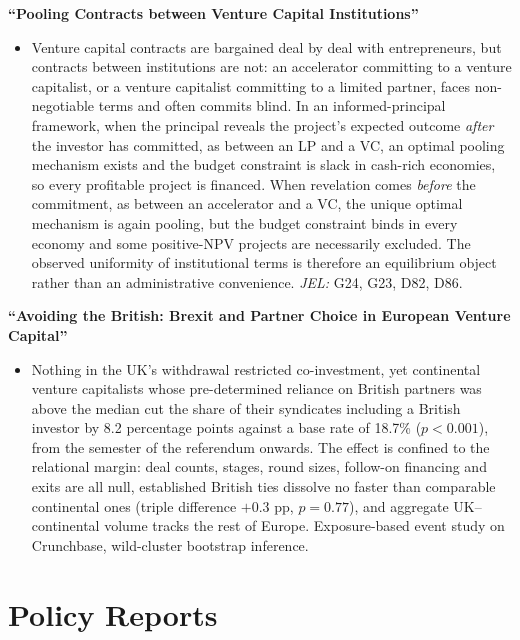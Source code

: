 \documentclass[11pt,a4paper]{article}
\begin{document}
\textbf{``Pooling Contracts between Venture Capital Institutions''}
\begin{itemize}[leftmargin=1.2em, itemsep=1pt, topsep=2pt]
\item Venture capital contracts are bargained deal by deal with entrepreneurs, but contracts
between institutions are not: an accelerator committing to a venture capitalist, or a venture
capitalist committing to a limited partner, faces non-negotiable terms and often commits
blind. In an informed-principal framework, when the principal reveals the project's expected
outcome \emph{after} the investor has committed, as between an LP and a VC, an optimal
pooling mechanism exists and the budget constraint is slack in cash-rich economies, so every
profitable project is financed. When revelation comes \emph{before} the commitment, as
between an accelerator and a VC, the unique optimal mechanism is again pooling, but the
budget constraint binds in every economy and some positive-NPV projects are necessarily
excluded. The observed uniformity of institutional terms is therefore an equilibrium object
rather than an administrative convenience. \emph{JEL:} G24, G23, D82, D86.
\end{itemize}

\vspace{0.3em}
\textbf{``Avoiding the British: Brexit and Partner Choice in European
Venture Capital''}
\begin{itemize}[leftmargin=1.2em, itemsep=1pt, topsep=2pt]
\item Nothing in the UK's withdrawal restricted co-investment, yet continental venture
capitalists whose pre-determined reliance on British partners was above the median cut
the share of their syndicates including a British investor by 8.2 percentage points
against a base rate of 18.7\% ($p<0.001$), from the semester of the referendum onwards.
The effect is confined to the relational margin: deal counts, stages, round sizes,
follow-on financing and exits are all null, established British ties dissolve no faster
than comparable continental ones (triple difference $+0.3$ pp, $p=0.77$), and aggregate
UK--continental volume tracks the rest of Europe. Exposure-based event study on
Crunchbase, wild-cluster bootstrap inference.
\end{itemize}

\section{Policy Reports}
\end{document}
